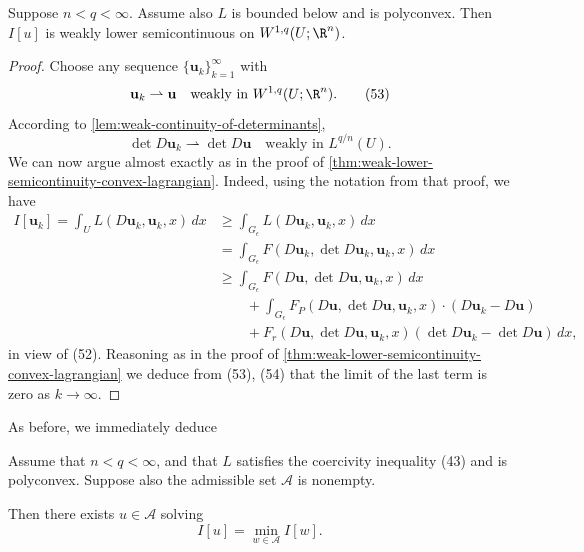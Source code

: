 \begin{theorem}
\label{thm:lower-semicontinuity-polyconvex}
Suppose $n < q < \infty$. Assume also $L$ is bounded below and is polyconvex. Then $I[u]$ is weakly lower semicontinuous on $W^{1,q}(U;\R^n)$.
\end{theorem}
\begin{proof}
Choose any sequence $\{\mathbf{u}_k\}_{k=1}^\infty$ with
\[
\mathbf{u}_k \rightharpoonup \mathbf{u} \quad \text{weakly in } W^{1,q}(U;\R^n).
\tag{53}
\]
According to \cref{lem:weak-continuity-of-determinants},
\[
\det D\mathbf{u}_k \rightharpoonup \det D\mathbf{u} \quad \text{weakly in } L^{q/n}(U).
\tag{54}
\]
We can now argue almost exactly as in the proof of \cref{thm:weak-lower-semicontinuity-convex-lagrangian}. Indeed, using the notation from that proof, we have
\[
\begin{aligned}
I[\mathbf{u}_k] = \int_U L(D\mathbf{u}_k, \mathbf{u}_k, x)\, dx &\geq \int_{G_\epsilon} L(D\mathbf{u}_k, \mathbf{u}_k, x)\, dx \\
&= \int_{G_\epsilon} F(D\mathbf{u}_k, \det D\mathbf{u}_k, \mathbf{u}_k, x)\, dx \\
&\geq \int_{G_\epsilon} F(D\mathbf{u}, \det D\mathbf{u}, \mathbf{u}_k, x)\, dx \\
&\qquad + \int_{G_\epsilon} F_P(D\mathbf{u}, \det D\mathbf{u}, \mathbf{u}_k, x) \cdot (D\mathbf{u}_k - D\mathbf{u}) \\
&\qquad + F_r(D\mathbf{u}, \det D\mathbf{u}, \mathbf{u}_k, x)(\det D\mathbf{u}_k - \det D\mathbf{u})\, dx,
\end{aligned}
\]
in view of (52). Reasoning as in the proof of \cref{thm:weak-lower-semicontinuity-convex-lagrangian} we deduce from (53), (54) that the limit of the last term is zero as $k \to \infty$.
\end{proof}

As before, we immediately deduce

\begin{theorem}
\label{thm:existence-minimizer-polyconvex}
Assume that $n < q < \infty$, and that $L$ satisfies the coercivity inequality (43) and is polyconvex. Suppose also the admissible set $\mathcal{A}$ is nonempty.

Then there exists $u \in \mathcal{A}$ solving
\[
I[u] = \min_{w \in \mathcal{A}} I[w].
\]
\end{theorem}

